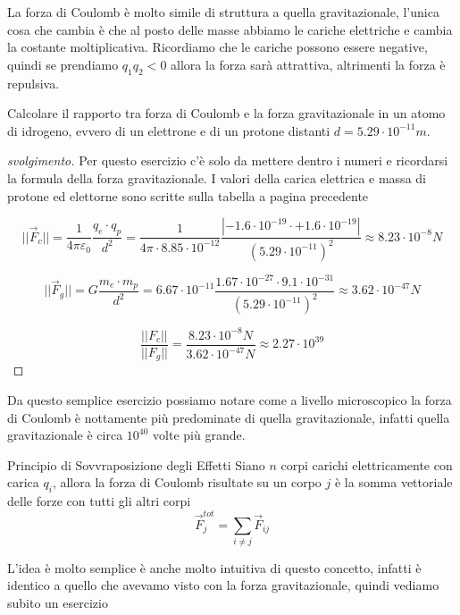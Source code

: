 \documentclass{rapport}
\begin{document}
La forza di Coulomb è molto simile di struttura a quella gravitazionale, l'unica cosa che cambia è che al posto delle masse abbiamo le cariche elettriche e cambia la costante moltiplicativa. Ricordiamo che le cariche possono essere negative, quindi se prendiamo $q_1q_2<0$ allora la forza sarà attrattiva, altrimenti la forza è repulsiva.

\begin{esercizio}{}{}
Calcolare il rapporto tra forza di Coulomb e la forza gravitazionale  in un atomo di idrogeno, evvero di un elettrone e di un protone distanti $d=5.29\cdot 10^{-11}m$. 
\end{esercizio}

\begin{proof}[svolgimento]
  Per questo esercizio c'è solo da mettere dentro i numeri e ricordarsi la formula della forza gravitazionale. I valori della carica elettrica e massa di protone ed elettorne sono scritte sulla tabella a pagina precedente

  \[
  ||\vec{F}_c|| = \dfrac{1}{4\pi\varepsilon_0} \dfrac{q_e \cdot q_p }{d^2} = \dfrac{1}{4\pi \cdot 8.85\cdot 10^{-12}} \dfrac{|-1.6\cdot 10^{-19} \cdot +1.6\cdot 10^{-19}|   }{(5.29\cdot 10^{-11})^2} \approx 8.23 \cdot 10^{-8} N
  \]


  \[
  ||\vec{F}_g|| = G \dfrac{m_e \cdot m_p }{d^2} = 6.67\cdot 10^{-11}  \dfrac{1.67\cdot 10^{-27} \cdot 9.1\cdot 10^{-31}   }{(5.29\cdot 10^{-11})^2} \approx 3.62 \cdot 10^{-47} N
  \]


  \[
  \dfrac{||F_c||}{||F_g||} = \dfrac{8.23 \cdot 10^{-8} N }{3.62 \cdot 10^{-47} N} \approx 2.27 \cdot 10^{39}
  \]
\end{proof}

Da questo semplice esercizio possiamo notare come a livello microscopico la forza di Coulomb è nottamente più predominate di quella gravitazionale, infatti quella gravitazionale è circa $10^{40}$ volte più grande.

\newpage

\begin{proposizione}{Principio di Sovvraposizione degli Effetti}{}
  Siano $n$ corpi carichi elettricamente con carica $q_i$, allora la forza di Coulomb risultate su un corpo $j$ è la somma vettoriale delle forze con tutti gli altri corpi
  \[
  \vec{F}^{tot}_j = \sum_{i\ne j} \vec{F}_{ij}
  \]
\end{proposizione}

L'idea è molto semplice è anche molto intuitiva di questo concetto, infatti è identico a quello che avevamo visto con la forza gravitazionale, quindi vediamo subito un esercizio 
\end{document}
